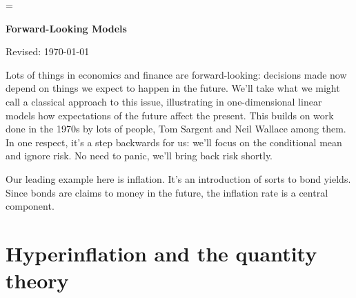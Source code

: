 \documentclass[11pt]{article}
\begin{document}
\parskip=\bigskipamount
\parindent=0.0in
\thispagestyle{empty}


\bigskip\bigskip
\centerline{\Large \bf Forward-Looking Models}
\centerline{Revised: \today}

\begin{comment}
??

Think about how this is organized, also how it ties
in with recursive methods.  

Do recursive methods first?  

Lucas:
http://www.nber.org/chapters/c6264.pdf

Page 199:
I take the purpose of this session to be to elicit views on economic
policy from economists of different points of view. The title
of the session, “Macroeconomic Policy, 1974/75 : What Should Have
Been Done?” does not seem to me useful for this purpose.

Page 205:
our ability as economists to predict the responses of
agents rests, in situations where expectations about the future matter,
on our understanding of the stochastic environment agents believe themselves
to be operating in. In practice, this limits the class of policies the
consequences of which we can hope to assess in advance to policies
generated by fixed, well understood, relatively permanent rules (or functions
relating policy actions taken to the state of the economy).
\end{comment}

\bigskip
Lots of things in economics and finance are forward-looking:
decisions made now depend on things we expect to happen in the future.
We'll take what we might call a classical approach to this issue,
illustrating in one-dimensional linear models how expectations of
the future affect the present.
This builds on work done in the 1970s by lots of people,
Tom Sargent and Neil Wallace among them.
In one respect, it's a step backwards for us:  we'll focus on the conditional mean
and ignore risk.
No need to panic, we'll bring back risk shortly.

Our leading example here is inflation.
It's an introduction of sorts to bond yields.
Since bonds are claims to money in the future,
the inflation rate is a central component.


\section{Hyperinflation and the quantity theory}
\end{document}
